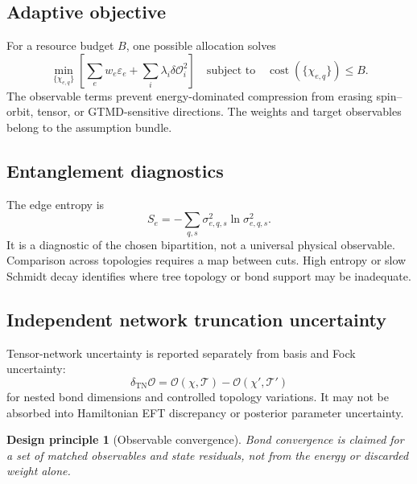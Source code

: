\documentclass[11pt]{article}
\newtheorem{principle}[definition]{Design principle}
\newcommand{\TN}{\ensuremath{\mathrm{TN}}}
\newcommand{\cO}{\mathcal O}
\newcommand{\cT}{\mathcal T}
\newcommand{\eps}{\varepsilon}
\begin{document}
\subsection{Adaptive objective}

For a resource budget \(B\), one possible allocation solves
\begin{equation}
 \min_{\{\chi_{e,q}\}}
 \left[
 \sum_e w_e\eps_e
 +\sum_i \lambda_i\delta\cO_i^2
 \right]
 \quad\text{subject to}\quad
 \operatorname{cost}(\{\chi_{e,q}\})\leq B.
\label{eq:adaptive-bond-objective}
\end{equation}
The observable terms prevent energy-dominated compression from erasing
spin--orbit, tensor, or GTMD-sensitive directions.  The weights and target
observables belong to the assumption bundle.

\subsection{Entanglement diagnostics}

The edge entropy is
\begin{equation}
 S_e=-\sum_{q,s}\sigma_{e,q,s}^{2}
 \ln\sigma_{e,q,s}^{2}.
\label{eq:edge-entropy}
\end{equation}
It is a diagnostic of the chosen bipartition, not a universal physical
observable.  Comparison across topologies requires a map between cuts.  High
entropy or slow Schmidt decay identifies where tree topology or bond support
may be inadequate.

\subsection{Independent network truncation uncertainty}

Tensor-network uncertainty is reported separately from basis and Fock
uncertainty:
\begin{equation}
 \delta_{\TN}\cO
 =
 \cO(\chi,\cT)-
 \cO(\chi',\cT')
\label{eq:tn-truncation-error}
\end{equation}
for nested bond dimensions and controlled topology variations.  It may not be
absorbed into Hamiltonian EFT discrepancy or posterior parameter uncertainty.

\begin{principle}[Observable convergence]
Bond convergence is claimed for a set of matched observables and state
residuals, not from the energy or discarded weight alone.
\end{principle}
\end{document}
